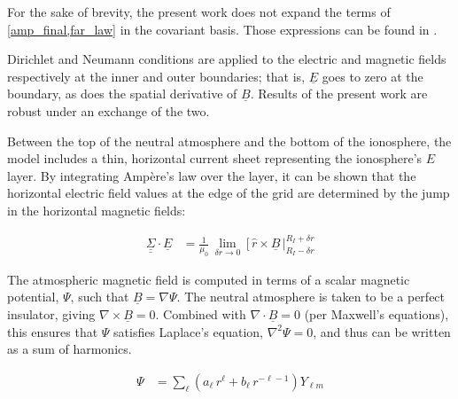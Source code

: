 \documentclass[draft,linenumbers]{agujournal}
\begin{document}
For the sake of brevity, the present work does not expand the terms of \cref{amp_final,far_law} in the covariant basis. Those expressions can be found in \citet{mceachern_2016}.


Dirichlet and Neumann conditions are applied to the electric and magnetic fields respectively at the inner and outer boundaries; that is, $\underline{E}$ goes to zero at the boundary, as does the spatial derivative of $\underline{B}$. Results of the present work are robust under an exchange of the two.

Between the top of the neutral atmosphere and the bottom of the ionosphere, the model includes a thin, horizontal current sheet representing the ionosphere's $E$ layer\citep{lysak_2004}. By integrating Amp\`ere's law over the layer, it can be shown\citep{fujita_1988} that the horizontal electric field values at the edge of the grid are determined by the jump in the horizontal magnetic fields:
\begin{linenomath*}
\begin{align}
  \label{jump_condition}
  \underline{\underline{\Sigma}} \cdot \underline{E} &= \frac{1}{\mu_0} \,
    \displaystyle\lim_{\delta \! r \rightarrow 0} \, \bigg[ \, \hat{r} \times \underline{B}
    \, \bigg|^{R_I + \delta \! r}_{R_I - \delta \! r}
\end{align}
\end{linenomath*}

The atmospheric magnetic field is computed in terms of a scalar magnetic potential, $\Psi$, such that $\underline{B}=\nabla \Psi$. The neutral atmosphere is taken to be a perfect insulator, giving $\nabla \times \underline{B}=0$. Combined with $\nabla \cdot \underline{B}=0$ (per Maxwell's equations), this ensures that $\Psi$ satisfies Laplace's equation, $\nabla^2 \Psi = 0$, and thus can be written as a sum of harmonics\citep{jackson_1999}.
\begin{linenomath*}
\begin{align}
  \label{psi_expansion}
  \Psi &= \displaystyle\sum_\ell \left( a_\ell \, r^\ell +
    b_\ell \, r^{-\ell - 1} \right) Y_{\ell m}
\end{align}
\end{linenomath*}
\end{document}
